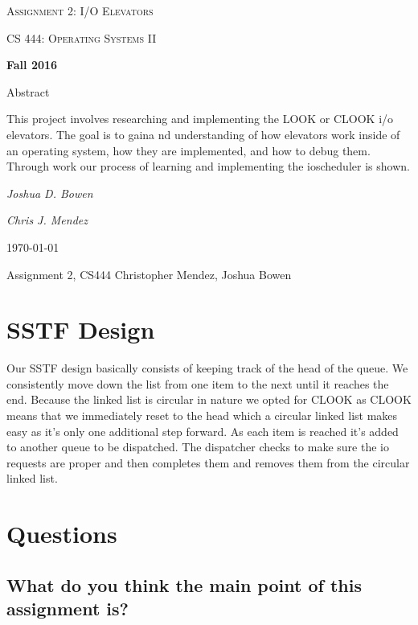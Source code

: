 \documentclass[letterpaper,10pt,titlepage]{article}
\begin{document}
\begin{titlepage}
	\centering
	\vspace*{4cm}
	{\scshape\huge Assignment 2: I/O Elevators\par}
	\vspace{1cm}
	{\scshape\LARGE CS 444: Operating Systems II\par}
	\vspace{0.5cm}
	{\large\bfseries Fall 2016\par}
	{\large Abstract\par}
	\vspace {0.5cm}
		This project involves researching and implementing the LOOK or CLOOK i/o elevators. The goal is to gaina nd understanding of how elevators work inside of an operating system, how they are implemented, and how to debug them. Through work our process of learning and implementing the ioscheduler is shown.
	\par
	\vspace{1cm}
	{\Large\itshape Joshua D. Bowen\par}
	{\Large\itshape Chris J. Mendez\par}
	\vfill
	{\large \today\par}	

\end{titlepage}

Assignment 2, CS444
Christopher Mendez, Joshua Bowen



\section{SSTF Design}

Our SSTF design basically consists of keeping track of the head of the queue. We consistently move down the list from one item to the next until it reaches the end. Because the linked list is circular in nature we opted for CLOOK as CLOOK means that we immediately reset to the head which a circular linked list makes easy as it's only one additional step forward. As each item is reached it's added to another queue to be dispatched. The dispatcher checks to make sure the io requests are proper and then completes them and removes them from the circular linked list.

\section{Questions}
\subsection{What do you think the main point of this assignment is?}
\end{document}

